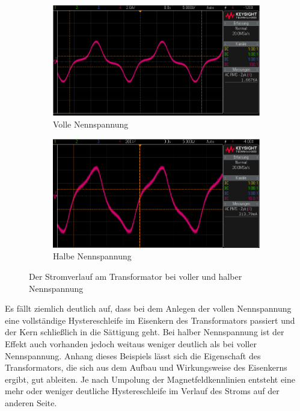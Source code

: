 \documentclass{article}
\begin{document}
\begin{figure}[h]
  \centering
  \begin{subfigure}{.45\textwidth}
    \centering
    \includegraphics[width=\linewidth]{../assets/images/gep3/trafostrom_voll.png}
    \caption{Volle Nennspannung}
  \end{subfigure}
  \begin{subfigure}{.45\textwidth}
    \centering
    \includegraphics[width=\linewidth]{../assets/images/gep3/trafostrom_halb.png}
    \caption{Halbe Nennspannung}
  \end{subfigure}
  \label{fig:31_242}
  \caption{Der Stromverlauf am Transformator bei voller und halber Nennspannung}
\end{figure}

Es fällt ziemlich deutlich auf, dass bei dem Anlegen der vollen Nennspannung eine vollständige Hystereschleife im Eisenkern des Transformators passiert und der Kern schließlich in die Sättigung geht. Bei halber Nennspannung ist der Effekt auch vorhanden jedoch weitaus weniger deutlich als bei voller Nennspannung. Anhang dieses Beispiels lässt sich die Eigenschaft des Transformators, die sich aus dem Aufbau und Wirkungsweise des Eisenkerns ergibt, gut ableiten. Je nach Umpolung der Magnetfeldkennlinien entsteht eine mehr oder weniger deutliche Hystereschleife im Verlauf des Stroms auf der anderen Seite.
\end{document}
